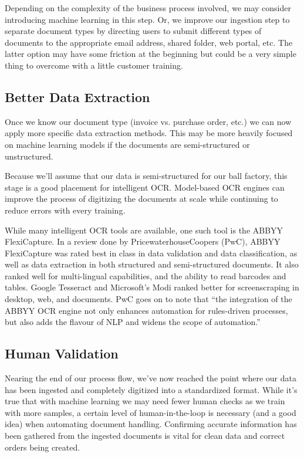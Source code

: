 \documentclass[conference, draftcls]{IEEEtran}
\begin{document}
Depending on the complexity of the business process involved, we may consider introducing machine learning in this step. Or, we improve our ingestion step to separate document types by directing users to submit different types of documents to the appropriate email address, shared folder, web portal, etc. The latter option may have some friction at the beginning but could be a very simple thing to overcome with a little customer training.

\subsection{Better Data Extraction}
Once we know our document type (invoice vs. purchase order, etc.) we can now apply more specific data extraction methods. This may be more heavily focused on machine learning models if the documents are semi-structured or unstructured.

Because we'll assume that our data is semi-structured for our ball factory, this stage is a good placement for intelligent OCR. Model-based OCR engines can improve the process of digitizing the documents at scale while continuing to reduce errors with every training.

While many intelligent OCR tools are available, one such tool is the ABBYY FlexiCapture. In a review done by PricewaterhouseCoopers (PwC), ABBYY FlexiCapture was rated best in class in data validation and data classification, as well as data extraction in both structured and semi-structured documents. It also ranked well for multi-lingual capabilities, and the ability to read barcodes and tables. Google Tesseract and Microsoft's Modi ranked better for screenscraping in desktop, web, and documents. PwC goes on to note that ``the integration of the ABBYY OCR engine not only enhances automation for rules-driven processes, but also adds the flavour of NLP and widens the scope of automation.'' \cite{pwc2018robotic}

\subsection{Human Validation}
Nearing the end of our process flow, we've now reached the point where our data has been ingested and completely digitized into a standardized format. While it's true that with machine learning we may need fewer human checks as we train with more samples, a certain level of human-in-the-loop is necessary (and a good idea) when automating document handling. Confirming accurate information has been gathered from the ingested documents is vital for clean data and correct orders being created.
\end{document}
